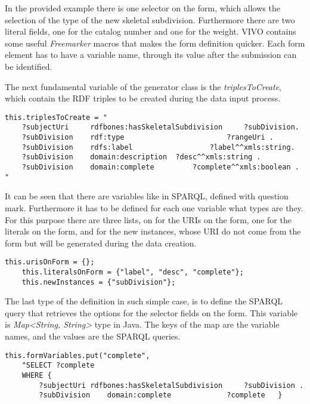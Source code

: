 In the provided example there is one selector on the form, which allows the selection of the type of the new skeletal subdivision. Furthermore there are two literal fields, one for the catalog number and one for the weight. VIVO contains some useful \textit{Freemarker} macros that makes the form definition quicker. Each form element has to have a variable name, through its value after the submission can be identified.
 
The next fundamental variable of the generator class is the \textit{triplesToCreate}, which contain the RDF triples to be created during the data input process. 

\begin{lstlisting}[captionpos=b, caption= RDF Triples to create, label=skullJSON, belowskip=1em, aboveskip=2em,
basicstyle=\footnotesize,frame=single]
this.triplesToCreate = "
	?subjectUri		rdfbones:hasSkeletalSubdivision		?subDivision.
	?subDivision	rdf:type						?rangeUri .
	?subDivision	rdfs:label					?label^^xmls:string.
	?subDivision	domain:description	?desc^^xmls:string .
	?subDivision	domain:complete			?complete^^xmls:boolean . "
\end{lstlisting}

It can be seen that there are variables like in SPARQL, defined with question mark. Furthermore it has to be defined for each one variable what types are they. For this purpose there are three lists, on for the URIs on the form, one for the literals on the form, and for the new instances, whose URI do not come from the form but will be generated during the data creation.

\begin{lstlisting}[captionpos=b, caption= Variable type definition, label=skullJSON, belowskip=1em, aboveskip=2em,
basicstyle=\footnotesize,frame=single]
	this.urisOnForm = {};
	this.literalsOnForm	= {"label", "desc", "complete"};
	this.newInstances = {"subDivision"};
\end{lstlisting}


The last type of the definition in such simple case, is to define the SPARQL query that retrieves the options for the selector fields on the form. This variable is \textit{Map<String, String>} type in Java. The keys of the map are the variable names, and the values are the SPARQL queries.

\begin{lstlisting}[captionpos=b, caption= Query for existing form data, label=skullJSON, belowskip=1em, aboveskip=2em,
basicstyle=\footnotesize,frame=single]
this.formVariables.put("complete", 
	"SELECT ?complete
	WHERE {
		?subjectUri	rdfbones:hasSkeletalSubdivision		?subDivision .
		?subDivision	domain:complete				?complete	}
\end{lstlisting}

